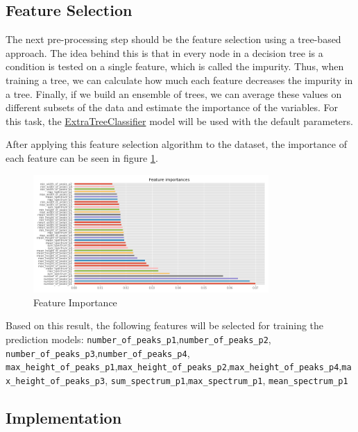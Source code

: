 \documentclass[11pt]{article}
\begin{document}
\hypertarget{feature-selection}{%
\subsection{Feature Selection}\label{feature-selection}}

The next pre-processing step should be the feature selection using a
tree-based approach. The idea behind this is that in every node in a
decision tree is a condition is tested on a single feature, which is
called the impurity. Thus, when training a tree, we can calculate how
much each feature decreases the impurity in a tree. Finally, if we build
an ensemble of trees, we can average these values on different subsets
of the data and estimate the importance of the variables. For this task,
the
\href{https://scikit-learn.org/stable/modules/generated/sklearn.ensemble.ExtraTreesClassifier.html}{ExtraTreeClassifier}
model will be used with the default parameters.

After applying this feature selection algorithm to the dataset, the
importance of each feature can be seen in figure \ref{fig:feat_importance}.

\begin{figure}[h]
\centering
\includegraphics[width=0.8\textwidth]{feature_importances.png}
\caption{Feature Importance}
\label{fig:feat_importance}
\end{figure}

Based on this result, the following features will be selected for
training the prediction models: \texttt{number\_of\_peaks\_p1},\texttt{number\_of\_peaks\_p2}, \texttt{number\_of\_peaks\_p3},\texttt{number\_of\_peaks\_p4}, \texttt{max\_height\_of\_peaks\_p1},\texttt{max\_height\_of\_peaks\_p2},\texttt{max\_height\_of\_peaks\_p4},\texttt{max\_height\_of\_peaks\_p3}, \texttt{sum\_spectrum\_p1},\texttt{max\_spectrum\_p1}, \texttt{mean\_spectrum\_p1}

\hypertarget{implementation}{%
\subsection{Implementation}\label{implementation}}
\end{document}
